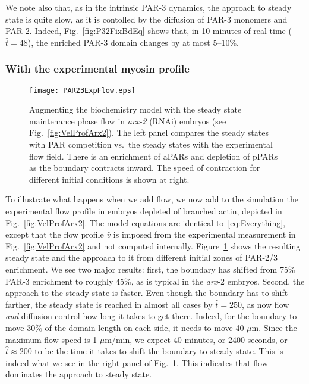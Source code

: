 \documentclass[11pt]{article}
\newcommand{\red}[1]{\color{red}#1\normalcolor}
\newcommand{\6}[1]{#1_{\text{6}}}
\newcommand{\3}[1]{#1_{\text{3}}}
\begin{document}
\red{We note also that, as in the intrinsic PAR-3 dynamics, the approach to steady state is quite slow, as it is contolled by the diffusion of PAR-3 monomers and PAR-2. Indeed, Fig.\ \ref{fig:P32FixBdEq} shows that, in 10 minutes of real time ($\hat t = 48$), the enriched PAR-3 domain changes by at most 5--10\%. }

\subsubsection{With the experimental myosin profile}
\begin{figure}
\centering
\texttt{[image: PAR23ExpFlow.eps]}
\caption{\label{fig:P32ExpFlow}Augmenting the biochemistry model with the steady state maintenance phase flow in \emph{arx-2} (RNAi) embryos (see Fig.\ \ref{fig:VelProfArx2}). The left panel compares the steady states with PAR competition vs.\ the steady states with the experimental flow field. There is an enrichment of aPARs and depletion of pPARs as the boundary contracts inward. The speed of contraction for different initial conditions is shown at right. }
\end{figure}


To illustrate what happens when we add flow, we now add to the simulation the experimental flow profile in embryos depleted of branched actin, depicted in Fig.\ \ref{fig:VelProfArx2}. The model equations are identical to\ \eqref{eq:Everything}, except that the flow profile $\hat v$ is imposed from the experimental measurement in Fig.\ \ref{fig:VelProfArx2} and not computed internally. Figure\ \ref{fig:P32ExpFlow} shows the resulting steady state and the approach to it from different initial zones of PAR-2/3 enrichment. We see two major results: first, the boundary has shifted from 75\% PAR-3 enrichment to roughly 45\%, as is typical in the \emph{arx}-2 embryos. Second, the approach to the steady state is faster. Even though the boundary has to shift farther, the steady state is reached in almost all cases by $\hat t = 250$, as now flow \emph{and} diffusion control how long it takes to get there. Indeed, for the boundary to move 30\% of the domain length on each side, it needs to move 40 $\mu$m. Since the maximum flow speed is 1 $\mu$m/min, we expect 40 minutes, or 2400 seconds, or $\hat t \approx 200$ to be the time it takes to shift the boundary to steady state. This is indeed what we see in the right panel of Fig.\ \ref{fig:P32ExpFlow}. This indicates that flow dominates the approach to steady state.
\end{document}
